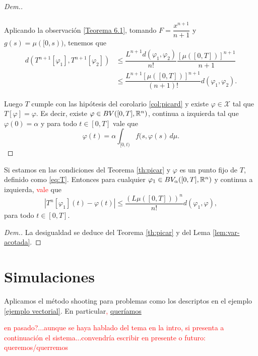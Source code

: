 \begin{proof}[Dem.]
\begin{enumerate}
\begin{equation*}
\begin{split}
    \end{split}
\end{equation*}
Aplicando la observación \ref{Teorema 6.1}, tomando $F=\dfrac{x^{n+1}}{n+1}$ y $g(s)=\mu([0,s))$, tenemos que
\begin{equation*}
    \begin{split}
d(T^{n+1}[\varphi_1],T^{n+1}[\varphi_2]) &\leq \dfrac{L^{n+1}d(\varphi_1,\varphi_2)}{n!}\dfrac{\left[\mu([0,T])\right]^{n+1}}{n+1}\\
&\leq \dfrac{L^{n+1}\left[\mu([0,T])\right]^{n+1}}{(n+1)!}d(\varphi_1,\varphi_2).
    \end{split}
\end{equation*}

\end{enumerate}
Luego $T$ cumple con las hipótesis del corolario \ref{col:picard} y existe $\varphi\in\mathcal{X}$ tal que $T[\varphi]=\varphi$. Es decir, existe $\varphi\in BV([0,T],\mathbb{R}^n)$, continua a izquierda tal que $\varphi(0)=\alpha$ y para todo $t\in[0,T]$ vale que
$$\varphi(t)=\alpha\int_{[0,t)}f(s,\varphi(s) \, d\mu.$$
\end{proof}

\begin{cor}\label{cor:velocidad}
Si estamos en las condiciones del Teorema \ref{th:picar} y $\varphi$ es un punto fijo de $T$, definido como \eqref{eq:T}. Entonces para cualquier $\varphi_1\in BV_\alpha([0,T],\mathbb{R}^n)$ y continua a izquierda, \textcolor{red}{vale} que
    \begin{equation}
    |T^n[\varphi_1](t)-\varphi(t)|\leq \dfrac{\left(L\mu([0,T])\right)^n}{n!}d(\varphi_1,\varphi)   ,     
    \end{equation}
para todo $t\in[0,T].$
\end{cor}
\begin{proof}[Dem.]
La desigualdad se deduce del Teorema \ref{th:picar} y del Lema \ref{lem:var-acotada}.
\end{proof}






\section{Simulaciones}

Aplicamos el método shooting para problemas como los descriptos en el ejemplo \ref{ejemplo vectorial}. En particular\textcolor{red}{,} \underline{queríamos}

\textcolor{red}{en pasado?...aunque se haya hablado del tema en la intro, si presenta a continuación el sistema...convendría escribir en presente o futuro: queremos/querremos} 

